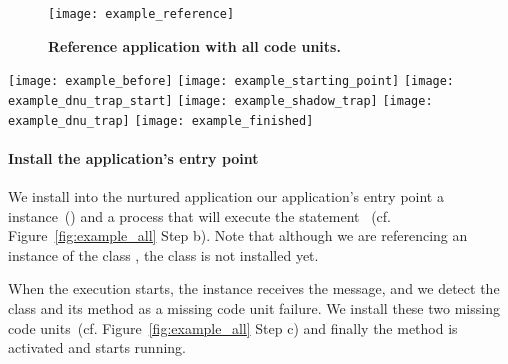 \begin{figure}[ht]
\begin{center}
\texttt{[image: example\_reference]}
\caption{\small\textbf{Reference application with all code units.}\label{fig:example_reference}}
\end{center}
\end{figure}


\begin{figure*}[ht]
\begin{center}
\texttt{[image: example\_before]}
\texttt{[image: example\_starting\_point]}
\texttt{[image: example\_dnu\_trap\_start]}
\texttt{[image: example\_shadow\_trap]}
\texttt{[image: example\_dnu\_trap]}
\texttt{[image: example\_finished]}
\caption{\small\textbf{The nurtured application at different steps of tailoring.} \label{fig:example_all}}
\end{center}
\end{figure*}

\paragraph{Install the application's entry point} We install into the nurtured application our application's entry point \ie a  instance~() and a process that will execute the statement ~(cf. Figure~\ref{fig:example_all} Step b). Note that although we are referencing an instance of the class , the  class is not installed yet.


When the execution starts, the  instance receives the  message, and we detect the  class and its  method as a missing code unit failure. We install these two missing code units~(cf. Figure~\ref{fig:example_all} Step c) and finally the  method is activated and starts running.


